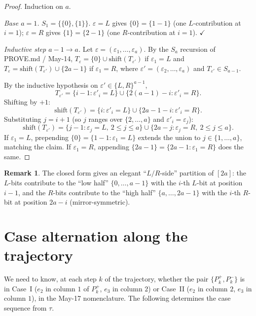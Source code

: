 \documentclass[11pt]{article}
\theoremstyle{definition}
\newtheorem{remark}[theorem]{Remark}
\begin{document}
\begin{proof}
Induction on $a$.

\emph{Base $a=1$.}  $S_1=\{\{0\},\{1\}\}$.  $\varepsilon=L$ gives
$\{0\}=\{1-1\}$ (one $L$-contribution at $i=1$); $\varepsilon=R$
gives $\{1\}=\{2-1\}$ (one $R$-contribution at $i=1$).  $\checkmark$

\emph{Inductive step $a-1\to a$.}  Let
$\varepsilon=(\varepsilon_1,\ldots,\varepsilon_a)$.  By the $S_a$
recursion of PROVE.md / May-14, $T_\varepsilon=\{0\}\cup
\mathrm{shift}(T_{\varepsilon'})$ if $\varepsilon_1=L$ and
$T_\varepsilon=\mathrm{shift}(T_{\varepsilon'})\cup\{2a-1\}$ if
$\varepsilon_1=R$, where
$\varepsilon'=(\varepsilon_2,\ldots,\varepsilon_a)$ and
$T_{\varepsilon'}\in S_{a-1}$.

By the inductive hypothesis on $\varepsilon'\in\{L,R\}^{a-1}$,
\[
   T_{\varepsilon'}=
   \{i-1 : \varepsilon'_i=L\}\cup\{2(a-1)-i : \varepsilon'_i=R\}.
\]
Shifting by $+1$:
\[
   \mathrm{shift}(T_{\varepsilon'})
   =\{i : \varepsilon'_i=L\}\cup\{2a-1-i : \varepsilon'_i=R\}.
\]
Substituting $j=i+1$ (so $j$ ranges over $\{2,\ldots,a\}$ and
$\varepsilon'_i=\varepsilon_j$):
\[
   \mathrm{shift}(T_{\varepsilon'})
   =\{j-1 : \varepsilon_j=L,\ 2\le j\le a\}
   \cup
   \{2a-j : \varepsilon_j=R,\ 2\le j\le a\}.
\]
If $\varepsilon_1=L$, prepending $\{0\}=\{1-1 : \varepsilon_1=L\}$
extends the union to $j\in\{1,\ldots,a\}$, matching the claim.  If
$\varepsilon_1=R$, appending $\{2a-1\}=\{2a-1 : \varepsilon_1=R\}$
does the same.
\end{proof}

\begin{remark}
The closed form gives an elegant ``$L/R$-side'' partition of $[2a]$:
the $L$-bits contribute to the ``low half'' $\{0,\ldots,a-1\}$ with
the $i$-th $L$-bit at position $i-1$, and the $R$-bits contribute to
the ``high half'' $\{a,\ldots,2a-1\}$ with the $i$-th $R$-bit at
position $2a-i$ (mirror-symmetric).
\end{remark}

\section{Case alternation along the trajectory}\label{sec:case-alt}

We need to know, at each step $k$ of the trajectory, whether the
pair $\{P_k^+,P_k^-\}$ is in Case~I ($e_2$ in column $1$ of $P_k^+$,
$e_3$ in column $2$) or Case~II ($e_2$ in column $2$, $e_3$ in column
$1$), in the May-17 nomenclature.  The following determines the
case sequence from $\tau$.
\end{document}
